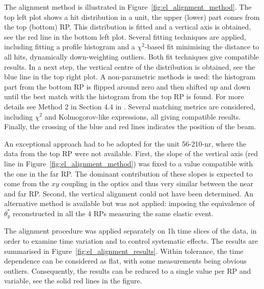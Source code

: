 \documentclass[TOTEM]{cern/cernphprep}
\begin{document}
The alignment method is illustrated in Figure~\ref{fig:el_alignment_method}. The top left plot shows a hit distribution in a unit, the upper (lower) part comes from the top (bottom) RP. This distribution is fitted and a vertical axis is obtained, see the red line in the bottom left plot. Several fitting techniques are applied, including fitting a profile histogram and a $\chi^2$-based fit minimising the distance to all hits, dynamically down-weighting outliers. Both fit techniques give compatible results. In a next step, the vertical centre of the distribution is obtained, see the blue line in the top right plot. A non-parametric methods is used: the histogram part from the bottom RP is flipped around zero and then shifted up and down until the best match with the histogram from the top RP is found. For more details see Method 2 in Section 4.4 in \cite{jan_thesis}. Several matching metrics are considered, including $\chi^2$ and Kolmogorov-like expressions, all giving compatible results. Finally, the crossing of the blue and red lines indicates the position of the beam.


An exceptional approach had to be adopted for the unit 56-210-nr, where the data from the top RP were not available. First, the slope of the vertical axis (red line in Figure~\ref{fig:el_alignment_method}) was fixed to a value compatible with the one in the far RP. The dominant contribution of these slopes is expected to come from the $xy$ coupling in the optics and thus very similar between the near and far RP. Second, the vertical alignment could not have been determined. An alternative method is available but was not applied: imposing the equivalence of $\theta_y^*$ reconstructed in all the 4 RPs measuring the same elastic event.

The alignment procedure was applied separately on 1h time slices of the data, in order to examine time variation and to control systematic effects. The results are summarised in Figure~\ref{fig:el_alignment_results}. Within tolerance, the time dependence can be considered as flat, with some measurements being obvious outliers. Consequently, the results can be reduced to a single value per RP and variable, see the solid red lines in the figure.
\end{document}

